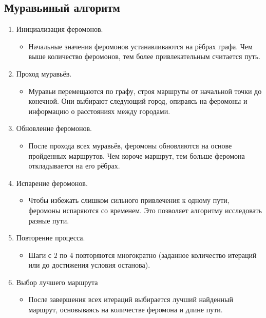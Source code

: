 \documentclass[12pt, a4paper]{article}
\begin{document}
\subsection{Муравьиный алгоритм}
\begin{enumerate}
    \item Инициализация феромонов.
    \begin{itemize}
        \item[---] Начальные значения феромонов устанавливаются на рёбрах графа. Чем выше количество феромонов, тем более привлекательным считается путь.
    \end{itemize}
    \item Проход муравьёв.
    \begin{itemize}
        \item[---] Муравьи перемещаются по графу, строя маршруты от начальной точки до конечной. Они выбирают следующий город, опираясь на феромоны и информацию о расстояниях между городами.
    \end{itemize}
    \item Обновление феромонов.
    \begin{itemize}
        \item[---] После прохода всех муравьёв, феромоны обновляются на основе пройденных маршрутов. Чем короче маршрут, тем больше феромона откладывается на его рёбрах.
    \end{itemize}
    \item Испарение феромонов.
    \begin{itemize}
        \item[---] Чтобы избежать слишком сильного привлечения к одному пути, феромоны испаряются со временем. Это позволяет алгоритму исследовать разные пути.
    \end{itemize}
    \item Повторение процесса.
     \begin{itemize}
        \item[---] Шаги с $2$ по $4$ повторяются многократно (заданное количество итераций или до достижения условия останова).
    \end{itemize}
    \item Выбор лучшего маршрута
     \begin{itemize}
        \item[---] После завершения всех итераций выбирается лучший найденный маршрут, основываясь на количестве феромона и длине пути.
    \end{itemize}
\end{enumerate}
\end{document}
